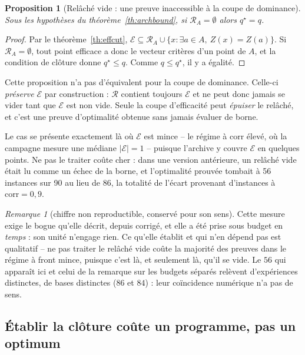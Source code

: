 \documentclass[11pt,a4paper]{article}
\theoremstyle{plain}
\newtheorem{proposition}{Proposition}
\theoremstyle{remark}
\newtheorem{remark}{Remarque}
\newcommand{\Ecal}{\mathcal{E}}
\newcommand{\Rcal}{\mathcal{R}}
\newcommand{\qs}{q^{\star}}
\begin{document}
\begin{proposition}[Relâché vide : une preuve inaccessible à la coupe de
dominance]\label{prop:vide}
Sous les hypothèses du théorème~\ref{th:archbound}, si $\Rcal_A=\emptyset$
alors $\qs=q$.
\end{proposition}

\begin{proof}
Par le théorème~\ref{th:effcut}, $\Ecal\subseteq\Rcal_A\cup\{x:\exists a\in
A,\ Z(x)=Z(a)\}$. Si $\Rcal_A=\emptyset$, tout point efficace a donc le
vecteur critères d'un point de $A$, et la condition de clôture donne
$\qs\le q$. Comme $q\le\qs$, il y a égalité.
\end{proof}

\noindent
Cette proposition n'a pas d'équivalent pour la coupe de dominance. Celle-ci
\emph{préserve} $\Ecal$ par construction : $\Rcal$ contient toujours
$\Ecal$ et ne peut donc jamais se vider tant que $\Ecal$ est non vide. Seule
la coupe d'efficacité peut \emph{épuiser} le relâché, et c'est une preuve
d'optimalité obtenue sans jamais évaluer de borne.

Le cas se présente exactement là où $\Ecal$ est mince -- le régime à
$\text{corr}$ élevé, où la campagne mesure une médiane $|\Ecal|=1$ --
puisque l'archive y couvre $\Ecal$ en quelques points. Ne pas le traiter
coûte cher : dans une version antérieure, un relâché vide était lu comme un
échec de la borne, et l'optimalité prouvée tombait à 56 instances sur 90
au lieu de 86, la totalité de l'écart provenant d'instances à
$\text{corr}=0{,}9$.

\begin{remark}[chiffre non reproductible, conservé pour son sens]
Cette mesure exige le bogue qu'elle décrit, depuis corrigé, et elle a été
prise sous budget en \emph{temps} : son unité n'engage rien. Ce qu'elle
établit et qui n'en dépend pas est qualitatif -- ne pas traiter le relâché
vide coûte la majorité des preuves dans le régime à front mince, puisque
c'est là, et seulement là, qu'il se vide. Le $56$ qui apparaît ici et celui
de la remarque sur les budgets séparés relèvent d'expériences distinctes,
de bases distinctes ($86$ et $84$) : leur coïncidence numérique n'a pas de
sens.
\end{remark}

\subsection{Établir la clôture coûte un programme, pas un optimum}
\end{document}
